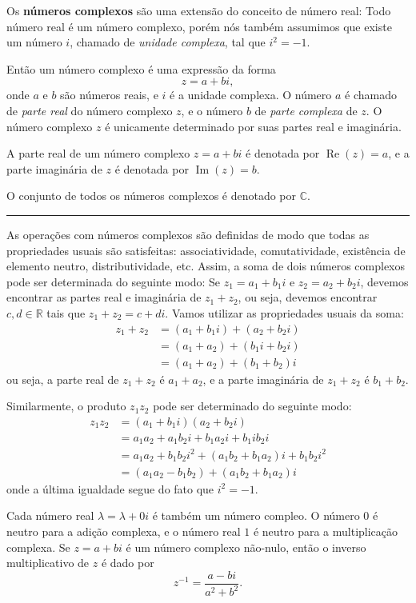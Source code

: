 Os \textbf{números complexos} são uma extensão do conceito de número real: Todo número real é um número complexo, porém nós também assumimos que existe um número $i$, chamado de \emph{unidade complexa}, tal que $i^2=-1$.

Então um número complexo é uma expressão da forma
\[z=a+bi,\]
onde $a$ e $b$ são números reais, e $i$ é a unidade complexa. O número $a$ é chamado de \emph{parte real} do número complexo $z$, e o número $b$ de \emph{parte complexa} de $z$. O número complexo $z$ é unicamente determinado por suas partes real e imaginária.

A parte real de um número complexo $z=a+bi$ é denotada por $\operatorname{Re}(z)=a$, e a parte imaginária de $z$ é denotada por $\operatorname{Im}(z)=b$.

O conjunto de todos os números complexos é denotado por $\mathbb{C}$.

\hrule

As operações com números complexos são definidas de modo que todas as propriedades usuais são satisfeitas: associatividade, comutatividade, existência de elemento neutro, distributividade, etc. Assim, a soma de dois números complexos pode ser determinada do seguinte modo: Se $z_1=a_1+b_1i$ e $z_2=a_2+b_2i$, devemos encontrar as partes real e imaginária de $z_1+z_2$, ou seja, devemos encontrar $c,d\in\mathbb{R}$ tais que $z_1+z_2=c+di$. Vamos utilizar as propriedades usuais da soma:
\begin{align*}
	z_1+z_2
		&=(a_1+b_1i)+(a_2+b_2i)\\
		&=(a_1+a_2)+(b_1i+b_2i)\tag{reagrupando}\\
		&=(a_1+a_2)+(b_1+b_2)i\tag{distributividade}
\end{align*}
ou seja, a parte real de $z_1+z_2$ é $a_1+a_2$, e a parte imaginária de $z_1+z_2$ é $b_1+b_2$.

Similarmente, o produto $z_1z_2$ pode ser determinado do seguinte modo:
\begin{align*}
	z_1z_2
		&=(a_1+b_1i)(a_2+b_2i)\\
		&=a_1a_2+a_1b_2i+b_1a_2i+b_1ib_2i\\
		&=a_1a_2+b_1b_2i^2+(a_1b_2+b_1a_2)i+b_1b_2i^2\\
		&=(a_1a_2-b_1b_2)+(a_1b_2+b_1a_2)i
\end{align*}
onde a última igualdade segue do fato que $i^2=-1$.

Cada número real $\lambda=\lambda+0i$ é também um número compleo. O número $0$ é neutro para a adição complexa, e o número real $1$ é neutro para a multiplicação complexa. Se $z=a+bi$ é um número complexo não-nulo, então o inverso multiplicativo de $z$ é dado por
\[z^{-1}=\frac{a-bi}{a^2+b^2}.\]

